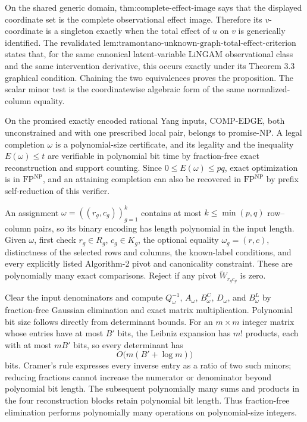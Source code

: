 On the shared generic domain, \(\text{thm:complete-effect-image}\) says that the displayed coordinate set is the complete observational effect image.  Therefore its \(v\)-coordinate is a singleton exactly when the total effect of \(u\) on \(v\) is generically identified.  The revalidated \(\text{lem:tramontano-unknown-graph-total-effect-criterion}\) states that, for the same canonical latent-variable LiNGAM observational class and the same intervention derivative, this occurs exactly under its Theorem 3.3 graphical condition.  Chaining the two equivalences proves the proposition.  The scalar minor test is the coordinatewise algebraic form of the same normalized-column equality.

On the promised exactly encoded rational Yang inputs, \(\mathrm{COMP\text{-}EDGE}\), both unconstrained and with one prescribed local pair, belongs to promise-\(\mathrm{NP}\).  A legal completion \(\omega\) is a polynomial-size certificate, and its legality and the inequality \(E(\omega)\le t\) are verifiable in polynomial bit time by fraction-free exact reconstruction and support counting.  Since \(0\le E(\omega)\le pq\), exact optimization is in \(\mathrm{FP}^{\mathrm{NP}}\), and an attaining completion can also be recovered in \(\mathrm{FP}^{\mathrm{NP}}\) by prefix self-reduction of this verifier.

An assignment \(\omega=((r_g,c_g))_{g=1}^k\) contains at most \(k\le\min(p,q)\) row--column pairs, so its binary encoding has length polynomial in the input length.  Given \(\omega\), first check \(r_g\in R_g\), \(c_g\in K_g\), the optional equality \(\omega_g=(r,c)\), distinctness of the selected rows and columns, the known-label conditions, and every explicitly listed Algorithm-2 pivot and canonicality constraint.  These are polynomially many exact comparisons.  Reject if any pivot \(\widetilde W_{r_gc_g}\) is zero.

Clear the input denominators and compute \(Q_\omega^{-1}\), \(A_\omega\), \(B^C_\omega\), \(D_\omega\), and \(B^L_\omega\) by fraction-free Gaussian elimination and exact matrix multiplication.  Polynomial bit size follows directly from determinant bounds.  For an \(m\times m\) integer matrix whose entries have at most \(B'\) bits, the Leibniz expansion has \(m!\) products, each with at most \(mB'\) bits, so every determinant has
\[
O\bigl(m(B'+\log m)\bigr)
\]
bits.  Cramer's rule expresses every inverse entry as a ratio of two such minors; reducing fractions cannot increase the numerator or denominator beyond polynomial bit length.  The subsequent polynomially many sums and products in the four reconstruction blocks retain polynomial bit length.  Thus fraction-free elimination performs polynomially many operations on polynomial-size integers.


